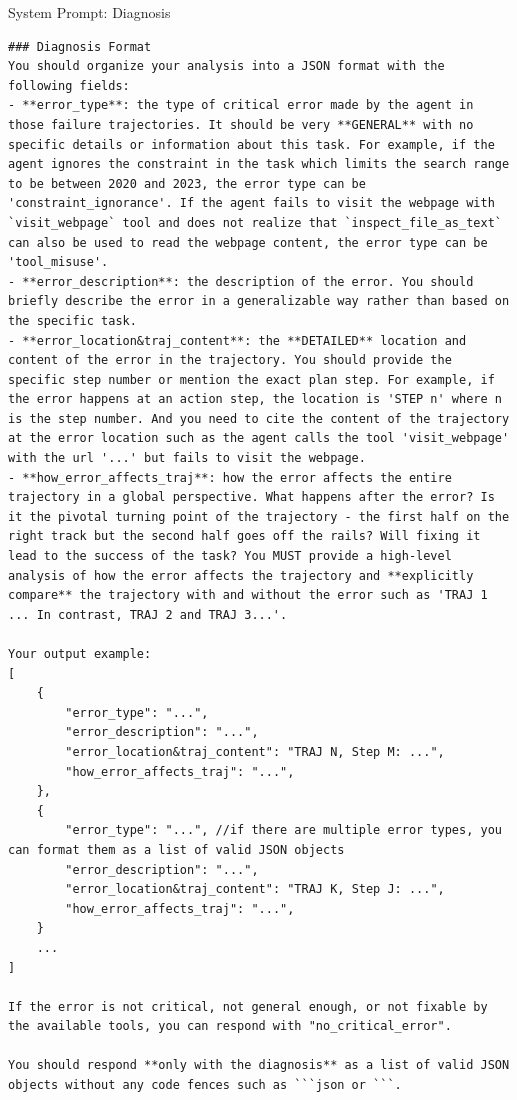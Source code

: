 \begin{SysPromptBox}{System Prompt: Diagnosis}
\begin{lstlisting}
### Diagnosis Format
You should organize your analysis into a JSON format with the following fields:
- **error_type**: the type of critical error made by the agent in those failure trajectories. It should be very **GENERAL** with no specific details or information about this task. For example, if the agent ignores the constraint in the task which limits the search range to be between 2020 and 2023, the error type can be 'constraint_ignorance'. If the agent fails to visit the webpage with `visit_webpage` tool and does not realize that `inspect_file_as_text` can also be used to read the webpage content, the error type can be 'tool_misuse'.
- **error_description**: the description of the error. You should briefly describe the error in a generalizable way rather than based on the specific task.
- **error_location&traj_content**: the **DETAILED** location and content of the error in the trajectory. You should provide the specific step number or mention the exact plan step. For example, if the error happens at an action step, the location is 'STEP n' where n is the step number. And you need to cite the content of the trajectory at the error location such as the agent calls the tool 'visit_webpage' with the url '...' but fails to visit the webpage.
- **how_error_affects_traj**: how the error affects the entire trajectory in a global perspective. What happens after the error? Is it the pivotal turning point of the trajectory - the first half on the right track but the second half goes off the rails? Will fixing it lead to the success of the task? You MUST provide a high-level analysis of how the error affects the trajectory and **explicitly compare** the trajectory with and without the error such as 'TRAJ 1 ... In contrast, TRAJ 2 and TRAJ 3...'.

Your output example:
[
    {
        "error_type": "...",
        "error_description": "...",
        "error_location&traj_content": "TRAJ N, Step M: ...",
        "how_error_affects_traj": "...",
    },
    {
        "error_type": "...", //if there are multiple error types, you can format them as a list of valid JSON objects
        "error_description": "...",
        "error_location&traj_content": "TRAJ K, Step J: ...",
        "how_error_affects_traj": "...",
    }
    ...
]

If the error is not critical, not general enough, or not fixable by the available tools, you can respond with "no_critical_error".

You should respond **only with the diagnosis** as a list of valid JSON objects without any code fences such as ```json or ```.

\end{lstlisting}
\end{SysPromptBox}


